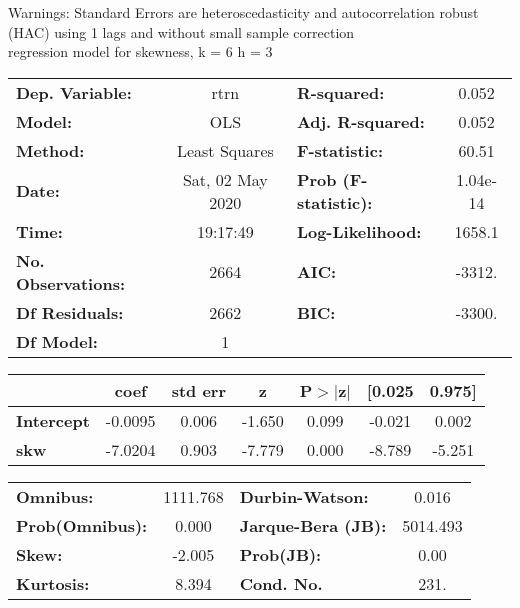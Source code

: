 Warnings: \newline
 [1] Standard Errors are heteroscedasticity and autocorrelation robust (HAC) using 1 lags and without small sample correction\\ 

regression model for skewness, k = 6 h = 3\begin{center}
\begin{tabular}{lclc}
\toprule
\textbf{Dep. Variable:}    &       rtrn       & \textbf{  R-squared:         } &     0.052   \\
\textbf{Model:}            &       OLS        & \textbf{  Adj. R-squared:    } &     0.052   \\
\textbf{Method:}           &  Least Squares   & \textbf{  F-statistic:       } &     60.51   \\
\textbf{Date:}             & Sat, 02 May 2020 & \textbf{  Prob (F-statistic):} &  1.04e-14   \\
\textbf{Time:}             &     19:17:49     & \textbf{  Log-Likelihood:    } &    1658.1   \\
\textbf{No. Observations:} &        2664      & \textbf{  AIC:               } &    -3312.   \\
\textbf{Df Residuals:}     &        2662      & \textbf{  BIC:               } &    -3300.   \\
\textbf{Df Model:}         &           1      & \textbf{                     } &             \\
\bottomrule
\end{tabular}
\begin{tabular}{lcccccc}
                   & \textbf{coef} & \textbf{std err} & \textbf{z} & \textbf{P$> |$z$|$} & \textbf{[0.025} & \textbf{0.975]}  \\
\midrule
\textbf{Intercept} &      -0.0095  &        0.006     &    -1.650  &         0.099        &       -0.021    &        0.002     \\
\textbf{skw}       &      -7.0204  &        0.903     &    -7.779  &         0.000        &       -8.789    &       -5.251     \\
\bottomrule
\end{tabular}
\begin{tabular}{lclc}
\textbf{Omnibus:}       & 1111.768 & \textbf{  Durbin-Watson:     } &    0.016  \\
\textbf{Prob(Omnibus):} &   0.000  & \textbf{  Jarque-Bera (JB):  } & 5014.493  \\
\textbf{Skew:}          &  -2.005  & \textbf{  Prob(JB):          } &     0.00  \\
\textbf{Kurtosis:}      &   8.394  & \textbf{  Cond. No.          } &     231.  \\
\bottomrule
\end{tabular}
\end{center}


